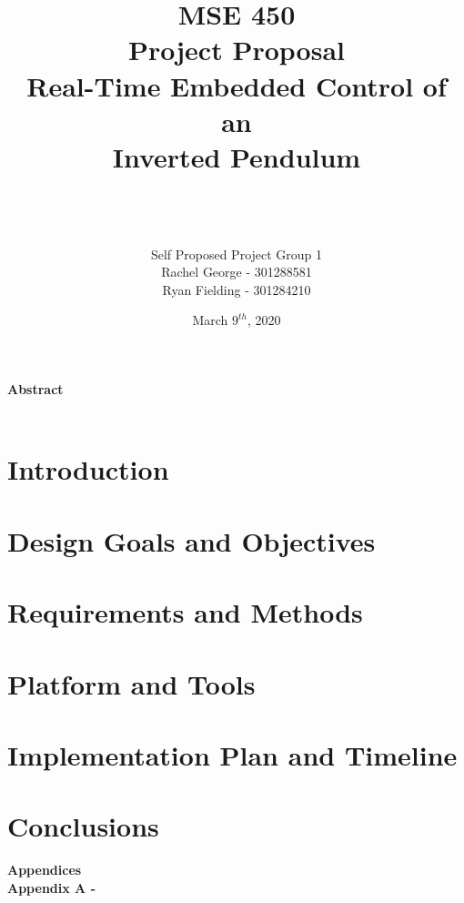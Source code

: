 \documentclass[12pt]{article}
\title{\textbf{MSE 450\\Project Proposal\\Real-Time Embedded Control of an\\Inverted Pendulum}}
\author{\\ \\ \\Self Proposed Project Group 1\\ Rachel George -  301288581 \\ Ryan Fielding - 301284210}
\date{March $9^{th}$, 2020}
\begin{document}
\maketitle
\newpage

{\Large \textbf{Abstract\\\\}}



\newpage
\tableofcontents
\listoffigures
\newpage

\section{Introduction}

\section{Design Goals and Objectives}

\section{Requirements and Methods}

\section{Platform and Tools}

\section{Implementation Plan and Timeline}

\section{Conclusions}




\nocite{*}



{\Large \textbf{Appendices\\}}\newline
{\large \textbf{Appendix A - \\}} 

% 
\end{document}
